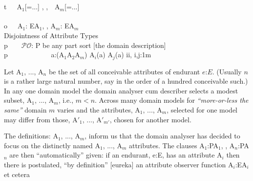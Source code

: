{ \\
\>\>\>\\
\>\>\>{\LBRACKET}t{\RBRACKET}\ \ \ A$_1$[=...] , {\DOTDOTDOT},\ \ A$_m$[=...]\\
\>\>\>\\
\>\>\>{\LBRACKET}o{\RBRACKET}\ \ \ {\attrmo}A$_1$: E{\RIGHTARROW}A$_1$, {\DOTDOTDOT}, {\attrmo}A$_m$: E{\RIGHTARROW}A$_m$\delaoi{\protect{\attrmo}}\label{attrAi}\\
\>\>\> {\LBRACKET}Disjointness of Attribute Types{\RBRACKET}\\
\>\>\>{\LBRACKET}p{\RBRACKET}\ \ \ \ $\mathcal{PO}$:  P  be any part sort  [the domain description]\label{attribute-po}\\
\>\>\>{\LBRACKET}p{\RBRACKET}\ \ \ \ \ \ \ \ \ \ \ \  a:(A$_1${\BAR}A$_2${\BAR}{\DOTDOTDOT}{\BAR}A$_m$)  {\ismo}A$_i$(a) {\NOTEQ} {\ismo}A$_j$(a) {\LBRACKET}i{\NOTEQ}i, i,j:{\LBRACKET}1{\DOTDOT}m{\RBRACKET}{\RBRACKET}   \eq\\
\ep
\edbrule
}

\noindent%
\pos{\psno}{\mnewfoil}%
\begynd%
\pind Let \textsf{A$_1$, ..., A$_n$} be the set of all
      conceivable attributes of endurant\ysfchg{ } $e$:$E$. 
\begynd
\pind (Usually $n$ is a
      rather large natural number, say in the order of a hundred
      conceivable such.) 
\pind In any one domain model the domain analyser
      cum describer selects a modest subset, \textsf{A$_1$,
        ..., A$_m$}, i.e., ${m}<{n}$. 
\pind Across many domain models \nyl for
      \textsl{``more-or-less the same''} domain $m$ varies \nyl and the
      attributes, \textsf{A$_1$,  ..., A$_m$}, \nyl selected for one
      model may differ \nyl from those, \textsf{A$'_1$, ..., A$'_{m'}$},
      chosen for another model.
\afslut
\mnewfoil
       
\pind The  definitions: 
      \textsf{A$_1$, ..., A$_m$},
      inform us that the domain analyser has decided to focus
      on the distinctly named \textsf{A$_1$, ..., A$_m$}
      attributes.
\pind The  clauses 
\begynd
\pind \textsf{\small\HHHH{\attrmo}A$_1$:P{\RIGHTARROW}A$_1$, 
\pind  {\DOTDOTDOT},
\pind       {\attrmo}A$_n$:P{\RIGHTARROW}A$_n$} 
\afslut \normalsize\HHHH
      are then ``automatically'' given:
\begynd
\pind if an endurant, \textsf{e:E}, has an attribute \textsf{A$_i$}
\pind then there is postulated, ``by definition'' [eureka] 
      \pos{}{\\} an attribute
      observer function
      \textsf{\small\HHHH{\attrmo}A$_i$:E{\RIGHTARROW}A$_i$}
      et cetera\dbsquare\ 
\afslut
\afslut\pos{\normalsize}{\HHHH}
\mnewfoil

